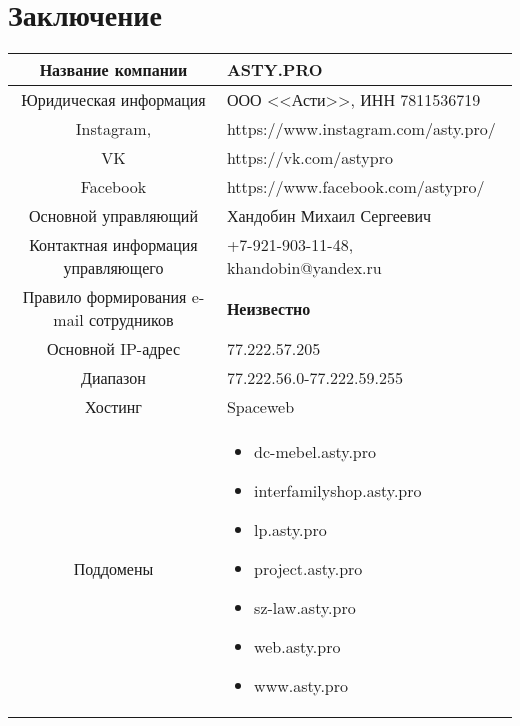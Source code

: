 \chapter{Заключение}

\begin{table}
	\begin{tabularx}{\textwidth}{|c|X|}
		\hline
		Название компании & ASTY.PRO \\ \hline
		Юридическая информация & ООО <<Асти>>, ИНН 7811536719 \\ \hline
		Instagram, & https://www.instagram.com/asty.pro/ \\ \hline
		VK & https://vk.com/astypro \\ \hline
		Facebook & https://www.facebook.com/astypro/ \\ \hline
		Основной управляющий & Хандобин Михаил Сергеевич \\ \hline
		Контактная информация управляющего & +7-921-903-11-48, khandobin@yandex.ru \\ \hline
		Правило формирования e-mail сотрудников & \textbf{Неизвестно} \\ \hline
		Основной IP-адрес & 77.222.57.205 \\ \hline
		Диапазон & 77.222.56.0-77.222.59.255 \\ \hline
		Хостинг & Spaceweb \\ \hline
		Поддомены & \begin{itemize}
			\item dc-mebel.asty.pro
			\item interfamilyshop.asty.pro
			\item lp.asty.pro
			\item project.asty.pro
			\item sz-law.asty.pro
			\item web.asty.pro
			\item www.asty.pro
		\end{itemize} \\ \hline
		
		

	\end{tabularx}
\end{table}